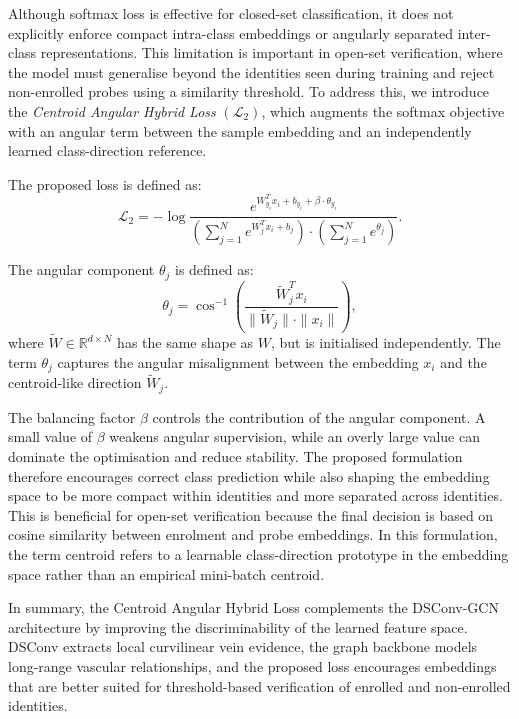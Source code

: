\documentclass[10pt,journal,compsoc]{IEEEtran}
\begin{document}
Although softmax loss is effective for closed-set classification, it does not explicitly enforce compact intra-class embeddings or angularly separated inter-class representations. This limitation is important in open-set verification, where the model must generalise beyond the identities seen during training and reject non-enrolled probes using a similarity threshold. To address this, we introduce the \textit{Centroid Angular Hybrid Loss} \((\mathcal{L}_2)\), which augments the softmax objective with an angular term between the sample embedding and an independently learned class-direction reference.

The proposed loss is defined as:
\begin{equation}
\mathcal{L}_2 = -\log\frac{e^{W_{y_i}^T x_i + b_{y_i} + \beta \cdot \theta_{y_i}}}{\left( \sum_{j=1}^{N} e^{W_j^T x_i + b_j} \right) \cdot \left( \sum_{j=1}^{N} e^{\theta_j} \right)}.
\label{eq:l2}
\end{equation}

The angular component \(\theta_j\) is defined as:
\begin{equation}
\theta_j = \cos^{-1} \left( \frac{\tilde{W}_j^T x_i}{\|\tilde{W}_j\| \cdot \|x_i\|} \right),
\end{equation}
where \(\tilde{W} \in \mathbb{R}^{d \times N}\) has the same shape as \(W\), but is initialised independently. The term \(\theta_j\) captures the angular misalignment between the embedding \(x_i\) and the centroid-like direction \(\tilde{W}_j\).

The balancing factor \(\beta\) controls the contribution of the angular component. A small value of \(\beta\) weakens angular supervision, while an overly large value can dominate the optimisation and reduce stability. The proposed formulation therefore encourages correct class prediction while also shaping the embedding space to be more compact within identities and more separated across identities. This is beneficial for open-set verification because the final decision is based on cosine similarity between enrolment and probe embeddings. In this formulation, the term centroid refers to a learnable class-direction prototype in the embedding space rather than an empirical mini-batch centroid.

In summary, the Centroid Angular Hybrid Loss complements the DSConv-GCN architecture by improving the discriminability of the learned feature space. DSConv extracts local curvilinear vein evidence, the graph backbone models long-range vascular relationships, and the proposed loss encourages embeddings that are better suited for threshold-based verification of enrolled and non-enrolled identities.
\end{document}
